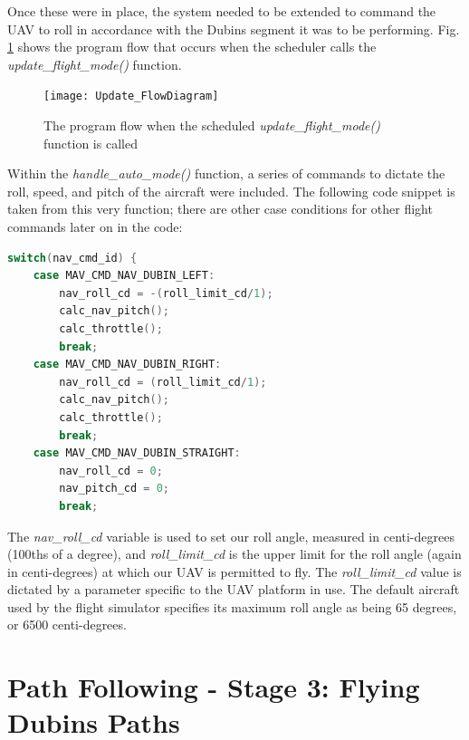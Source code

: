 Once these were in place, the system needed to be extended to command the UAV to roll in accordance with the Dubins segment it was to be performing. Fig. \ref{fig:updateFlow} shows the program flow that occurs when the scheduler calls the \textit{update\_flight\_mode()} function.

\begin{figure}[htbp!] 
\centering    
\texttt{[image: Update\_FlowDiagram]}
\caption[Scheduled program flow to update the current ArduPlane flight mode]{The program flow when the scheduled \textit{update\_flight\_mode()} function is called}
\label{fig:updateFlow}
\end{figure}

Within the \textit{handle\_auto\_mode()} function, a series of commands to dictate the roll, speed, and pitch of the aircraft were included. The following code snippet is taken from this very function; there are other case conditions for other flight commands later on in the code:

\begin{minipage}{\linewidth}
\begin{lstlisting}[language=C++]
switch(nav_cmd_id) {
    case MAV_CMD_NAV_DUBIN_LEFT:
        nav_roll_cd = -(roll_limit_cd/1);
        calc_nav_pitch();
        calc_throttle();
        break;
    case MAV_CMD_NAV_DUBIN_RIGHT:
        nav_roll_cd = (roll_limit_cd/1);
        calc_nav_pitch();
        calc_throttle();
        break;
    case MAV_CMD_NAV_DUBIN_STRAIGHT:
        nav_roll_cd = 0;
        nav_pitch_cd = 0;
        break;
\end{lstlisting}
\end{minipage}

The \textit{nav\_roll\_cd} variable is used to set our roll angle, measured in centi-degrees (100ths of a degree), and \textit{roll\_limit\_cd} is the upper limit for the roll angle (again in centi-degrees) at which our UAV is permitted to fly. The \textit{roll\_limit\_cd} value is dictated by a parameter specific to the UAV platform in use. The default aircraft used by the flight simulator specifies its maximum roll angle as being 65 degrees, or 6500 centi-degrees. 


\section{Path Following - Stage 3: Flying Dubins Paths}
\label{task2:stage3}

